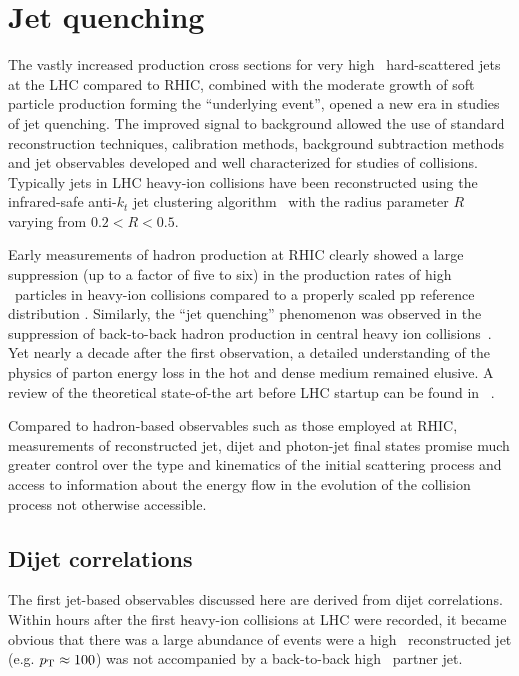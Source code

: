 \section{Jet quenching}
\label{jets_intro}

The vastly increased production cross sections for very high \pT\ hard-scattered jets at the LHC
compared to RHIC, combined with the moderate growth of soft particle production forming the ``underlying
event'', opened a new era in studies of jet quenching. The improved signal to background allowed the
use of standard reconstruction techniques, calibration methods, background subtraction methods and
jet observables developed and well characterized for studies of \pp collisions.
Typically jets in LHC heavy-ion collisions have been reconstructed using
the infrared-safe anti-$k_t$ jet clustering algorithm~\cite{Cacciari:2008gp} with the
radius parameter $R$ varying from $0.2 < R  < 0.5$.

Early measurements of hadron production at RHIC
clearly showed a large suppression (up to a factor of five to six) in the production rates of
high \pT\ particles in heavy-ion collisions compared to a properly scaled pp reference distribution
\cite{Adcox:2001jp,Adler:2002xw}. Similarly, the ``jet quenching'' phenomenon was observed
in the suppression of back-to-back hadron production
in central heavy ion collisions~\cite{Adcox:2001jp,Adler:2002xw}. Yet nearly a decade after the first observation, a detailed
understanding of the physics of parton energy loss in the hot and dense medium remained
elusive. A review of the theoretical state-of-the art before LHC startup can be
found in ~\cite{Wiedemann:2009sh}.

Compared to hadron-based observables such as those employed at RHIC, measurements of reconstructed
jet, dijet and photon-jet final states promise much greater control over the type and kinematics
of the initial scattering process and access to information about the energy flow in the evolution
of the collision process not otherwise accessible.

\subsection{Dijet correlations}

The first jet-based observables discussed here are derived from dijet correlations. Within hours
after the first heavy-ion collisions at LHC were recorded, it became obvious that there was
a large abundance of events were a high \pT\ reconstructed jet (e.g. $\mbox{$p_{\mathrm{T}}$} \approx 100$\GeVc) was
not accompanied by a back-to-back high \pT\ partner jet.

